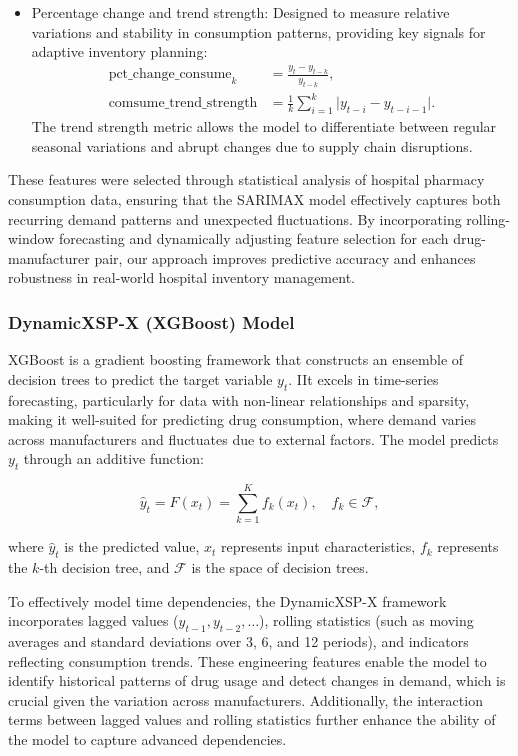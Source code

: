 \documentclass[journal]{IEEEtran}
\begin{document}
\begin{itemize}
    \item Percentage change and trend strength: Designed to measure relative variations and stability in consumption patterns, providing key signals for adaptive inventory planning:
    \begin{align}
    \text{pct\_change\_consume}_{k} &= \frac{y_{t} - y_{t-k}}{y_{t-k}}, \\
    \text{comsume\_trend\_strength} &= \frac{1}{k} \sum_{i=1}^{k} \lvert y_{t-i} - y_{t-i-1} \rvert.
    \end{align}
    The trend strength metric allows the model to differentiate between regular seasonal variations and abrupt changes due to supply chain disruptions.
\end{itemize}

These features were selected through statistical analysis of hospital pharmacy consumption data, ensuring that the SARIMAX model effectively captures both recurring demand patterns and unexpected fluctuations. By incorporating rolling-window forecasting and dynamically adjusting feature selection for each drug-manufacturer pair, our approach improves predictive accuracy and enhances robustness in real-world hospital inventory management.

\subsubsection{DynamicXSP-X (XGBoost) Model}

XGBoost is a gradient boosting framework that constructs an ensemble of decision trees to predict the target variable \(y_t\). IIt excels in time-series forecasting, particularly for data with non-linear relationships and sparsity, making it well-suited for predicting drug consumption, where demand varies across manufacturers and fluctuates due to external factors. The model predicts \(y_t\) through an additive function:

\begin{equation}
\hat{y}_{t} = F(x_{t}) = \sum_{k=1}^{K} f_{k}(x_{t}), \quad f_{k} \in \mathcal{F},
\end{equation}

where \(\hat{y}_{t}\) is the predicted value, \(x_{t}\) represents input characteristics, \(f_{k}\) represents the \(k\)-th decision tree, and \(\mathcal{F}\) is the space of decision trees.

To effectively model time dependencies, the DynamicXSP-X framework incorporates lagged values (\(y_{t-1}, y_{t-2}, \dots\)), rolling statistics (such as moving averages and standard deviations over 3, 6, and 12 periods), and indicators reflecting consumption trends. These engineering features enable the model to identify historical patterns of drug usage and detect changes in demand, which is crucial given the variation across manufacturers. Additionally, the interaction terms between lagged values and rolling statistics further enhance the ability of the model to capture advanced dependencies.
\end{document}
